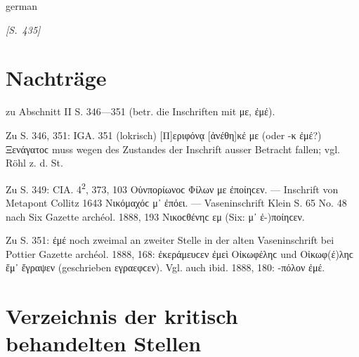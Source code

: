 \begin{otherlanguage*}{german}
\hfill {} \hspace{1ex}

\hypertarget{p435}{\emph{[S.~435]}}\label{p435}

\section*{Nachträge}

zu Abschnitt II S. 346—351 (betr. die Inschriften mit με, ἐμέ).

Zu S. 346, 351: IGA. 351 (lokrisch) [Π]εριφόνᾳ [ἀνέθη]κέ με (oder -κ ἐμέ?) Ξενάγατοϲ muss wegen des Zustandes der Inschrift ausser Betracht fallen; vgl. Röhl z. d. St.

Zu S. 349: CIA. 4\textsuperscript{2}, 373, 103 Οὑνπορίωνοϲ Φίλων με ἐποίηϲεν. — Inschrift von Metapont Collitz 1643 Νικόμαχόϲ μ᾽ ἐπόει. — Vaseninschrift Klein S. 65 No. 48 nach Six Gazette archéol. 1888, 193 Νικοϲθένηϲ εμ (Six: μ᾽ ἐ-)ποίηϲεν.

Zu S. 351: ἐμέ noch zweimal an zweiter Stelle in der alten Vaseninschrift bei Pottier Gazette archéol. 1888, 168: ἐκεράμευϲεν ἐμεὶ Οἰκωφέληϲ und Οἰκωφ(έ)ληϲ ἔμ᾽ ἔγραψεν (geschrieben εγραεφϲεν). Vgl. auch ibid. 1888, 180: -πόλον ἐμέ.

\section*{Verzeichnis der kritisch behandelten Stellen}
\largerpage


\end{otherlanguage*}
